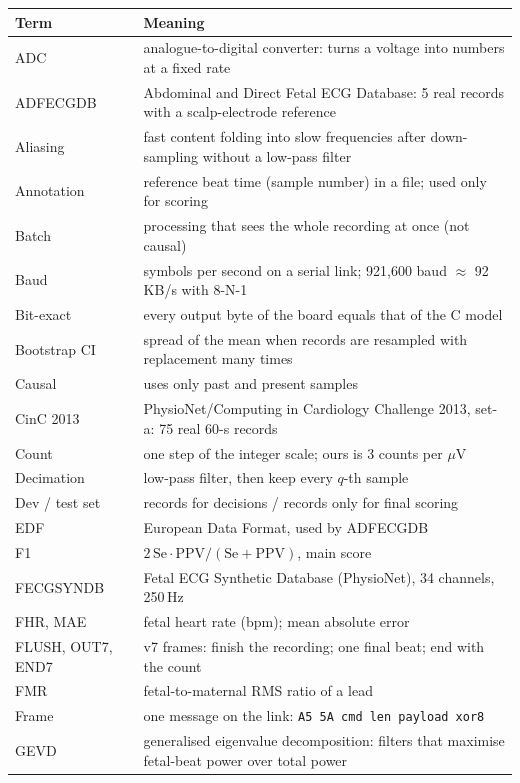 \documentclass[11pt]{article}
\begin{document}
{\small
\begin{longtable}{@{}p{3.6cm} p{11.9cm}@{}}
\toprule
\textbf{Term} & \textbf{Meaning} \\
\midrule
\endhead
ADC & analogue-to-digital converter: turns a voltage into numbers at a fixed rate \\
ADFECGDB & Abdominal and Direct Fetal ECG Database: 5 real records with a scalp-electrode reference \\
Aliasing & fast content folding into slow frequencies after down-sampling without a low-pass filter \\
Annotation & reference beat time (sample number) in a file; used only for scoring \\
Batch & processing that sees the whole recording at once (not causal) \\
Baud & symbols per second on a serial link; 921,600 baud $\approx$ 92 KB/s with 8-N-1 \\
Bit-exact & every output byte of the board equals that of the C model \\
Bootstrap CI & spread of the mean when records are resampled with replacement many times \\
Causal & uses only past and present samples \\
CinC 2013 & PhysioNet/Computing in Cardiology Challenge 2013, set-a: 75 real 60-s records \\
Count & one step of the integer scale; ours is 3 counts per $\mu$V \\
Decimation & low-pass filter, then keep every $q$-th sample \\
Dev / test set & records for decisions / records only for final scoring \\
EDF & European Data Format, used by ADFECGDB \\
F1 & $2\,\text{Se}\cdot\text{PPV}/(\text{Se}+\text{PPV})$, main score \\
FECGSYNDB & Fetal ECG Synthetic Database (PhysioNet), 34 channels, 250\,Hz \\
FHR, MAE & fetal heart rate (bpm); mean absolute error \\
FLUSH, OUT7, END7 & v7 frames: finish the recording; one final beat; end with the count \\
FMR & fetal-to-maternal RMS ratio of a lead \\
Frame & one message on the link: \texttt{A5 5A cmd len payload xor8} \\
GEVD & generalised eigenvalue decomposition: filters that maximise fetal-beat power over total power \\

\end{longtable}}
\end{document}
